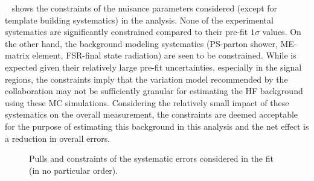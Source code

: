 \begin{itemize}
    ~ shows the constraints of the nuisance parameters considered (except for template building systematics) in the analysis. None of the experimental systematics are significantly constrained compared to their pre-fit $1\sigma$ values. On the other hand, the background modeling systematics (PS-parton shower, ME-matrix element, FSR-final state radiation) are seen to be constrained. While is expected given their relatively large pre-fit uncertainties, especially in the signal regions, the constraints imply that the variation model recommended by the collaboration may not be sufficiently granular for estimating the HF background using these MC simulations. Considering the relatively small impact of these systematics on the overall measurement, the constraints are deemed acceptable for the purpose of estimating this background in this analysis and the net effect is a reduction in overall errors.

    \begin{figure}[!htbp]
        \centering
        \caption{Pulls and constraints of the systematic errors considered in the fit (in no particular order).}
        \label{fig:bkg_only_pulls}
    \end{figure}


\end{itemize}
